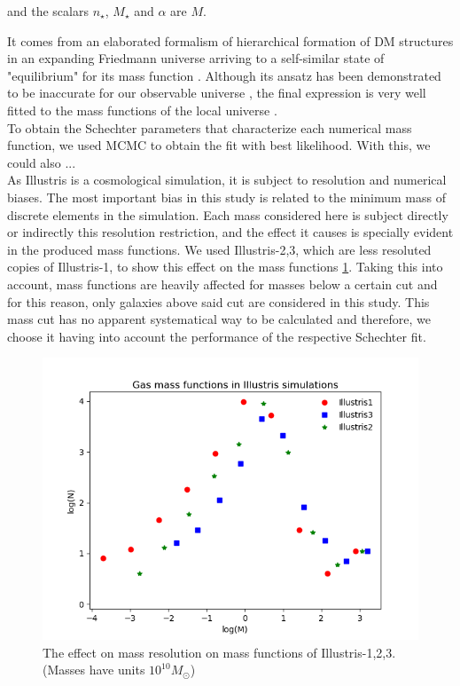\documentclass[a4paper,fleqn,usenatbib]{mnras}
\begin{document}
and the scalars $n_{\star}$, $M_{\star}$ and $\alpha$ are 
$M$.



It comes from an elaborated formalism of hierarchical formation of DM structures in an expanding Friedmann universe arriving to a self-similar state of "equilibrium" for its mass function \cite{Schechter1976}.
Although its ansatz has been demonstrated to be inaccurate for our
observable universe \cite{inaccurateSchechter}, the final expression
is very well fitted to the mass functions of the local universe
\cite{wellfitSchechter}.\\ 




To obtain the Schechter parameters that characterize each numerical mass function, we used MCMC to obtain the fit with best likelihood. 
With this, we could also ...\\

As Illustris is a cosmological simulation, it is subject to resolution and numerical biases.
The most important bias in this study is related to the minimum mass of discrete elements in the simulation.
Each mass considered here is subject directly or indirectly this resolution restriction, and the effect it causes is specially evident in the produced mass functions. 
We used Illustris-2,3, which are less resoluted copies of Illustris-1, to show this effect on the mass functions \ref{fig:resolution effects}. 
Taking this into account, mass functions are heavily affected for masses below a certain cut and for this reason, only galaxies above said cut are considered in this study.
This mass cut has no apparent systematical way to be calculated and therefore, we choose it having into account the performance of the respective Schechter fit.\\

\begin{figure}
	\includegraphics[width=\columnwidth]{./pics/MassResolution.png}
    \caption{The effect on mass resolution on mass functions of Illustris-1,2,3. (Masses have units $10^{10}M_\odot$)} 
    \label{fig:resolution effects}
\end{figure}
\end{document}
